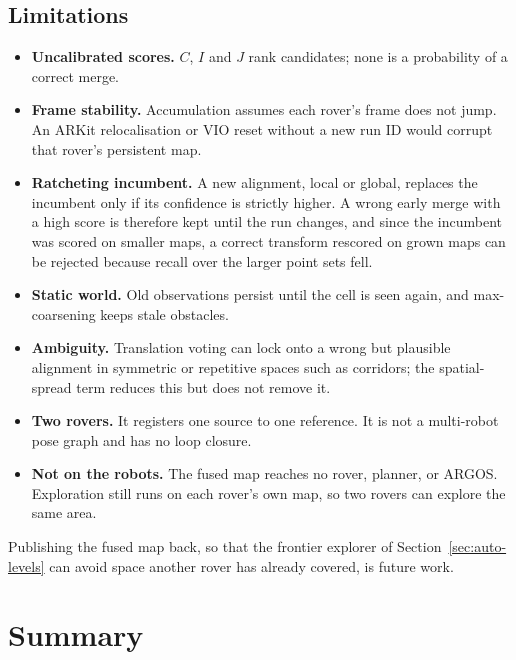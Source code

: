 \subsection{Limitations}

\begin{itemize}
  \item \textbf{Uncalibrated scores.} $C$, $I$ and $J$ rank candidates; none is a probability of a correct merge.
  \item \textbf{Frame stability.} Accumulation assumes each rover's frame does not jump. An ARKit relocalisation or VIO reset without a new run ID would corrupt that rover's persistent map.
  \item \textbf{Ratcheting incumbent.} A new alignment, local or global, replaces the incumbent only if its confidence is strictly higher. A wrong early merge with a high score is therefore kept until the run changes, and since the incumbent was scored on smaller maps, a correct transform rescored on grown maps can be rejected because recall over the larger point sets fell.
  \item \textbf{Static world.} Old observations persist until the cell is seen again, and max-coarsening keeps stale obstacles.
  \item \textbf{Ambiguity.} Translation voting can lock onto a wrong but plausible alignment in symmetric or repetitive spaces such as corridors; the spatial-spread term reduces this but does not remove it.
  \item \textbf{Two rovers.} It registers one source to one reference. It is not a multi-robot pose graph and has no loop closure.
  \item \textbf{Not on the robots.} The fused map reaches no rover, planner, or ARGOS. Exploration still runs on each rover's own map, so two rovers can explore the same area.
\end{itemize}

Publishing the fused map back, so that the frontier explorer of Section~\ref{sec:auto-levels} can avoid space another rover has already covered, is future work.

\section{Summary}

